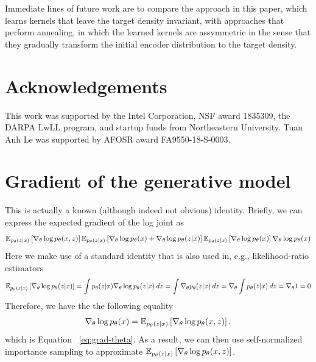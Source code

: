 \documentclass{article}
\theoremstyle{definition}
\begin{document}
Immediate lines of future work are to compare the approach in this paper, which learns kernels that leave the target density invariant, with approaches that perform annealing, in which the learned kernels are assymmetric in the sense that they gradually transform the initial encoder distribution to the target density. 

\section{Acknowledgements}

This work was supported by the Intel Corporation, NSF award 1835309, the DARPA LwLL program, and startup funds from Northeastern University. Tuan Anh Le was supported by AFOSR award FA9550-18-S-0003.




\newpage
\appendix
\onecolumn
{}
\section{Gradient of the generative model}%
\label{appendix:grad-theta}
This is actually a known (although indeed not obvious) identity. Briefly, we can express the expected gradient of the log joint as
\begin{align*}
    \mathbb{E}_{p_\theta(z | x)} 
    \left[
    \nabla_\theta \log p_\theta(x, z)
    \right]
    \mathbb{E}_{p_\theta(z | x)} 
    \left[
    \nabla_\theta \log p_\theta(x) + \nabla_\theta \log p_\theta(z | x)
    \right]
    \mathbb{E}_{p_\theta(z | x)} 
    \left[
    \nabla_\theta \log p_\theta(x) 
    \right]
    \nabla_\theta \log p_\theta(x)
\end{align*}
Here we make use of a standard identity that is also used in, e.g., likelihood-ratio estimators
\begin{align*}
\mathbb{E}_{p_\theta(z | x)}
\left[
    \nabla_\theta \log p_\theta(z | x)
\right] 
=
\int p_\theta(z | x) \nabla_\theta \log p_\theta(z | x) \: dz
=
\int \nabla_\theta p_\theta(z | x) \: dz
=
\nabla_\theta \int p_\theta(z | x) \: dz
=
\nabla_\theta 1
= 
0
\end{align*}
Therefore, we have the the following equality
\begin{align*}
\nabla_\theta \log p_\theta(x) 
= 
\mathbb{E}_{p_\theta(z | x)} 
\left[
\nabla_\theta \log p_\theta(x, z)
\right].
\end{align*}
which is Equation ~\ref{eq:grad-theta}. As a result, we can then use self-normalized importance sampling to approximate     $\mathbb{E}_{p_\theta(z | x)} \left[\nabla_\theta \log p_\theta(x, z) \right]$.
\end{document}
